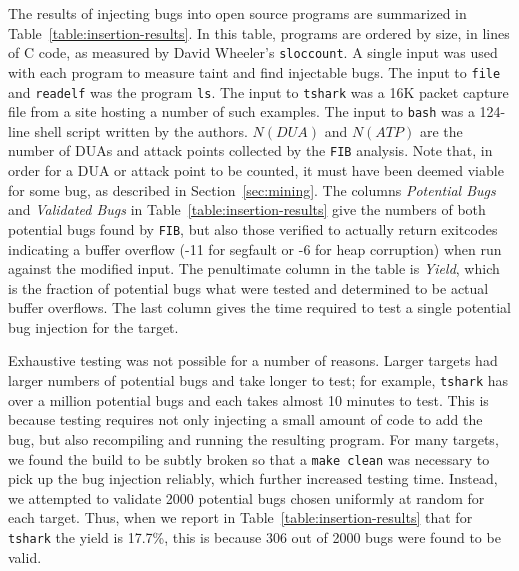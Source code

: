 The results of injecting bugs into open source programs are summarized in Table~\ref{table:insertion-results}.
In this table, programs are ordered by size, in lines of C code, as measured by David Wheeler's \verb+sloccount+.
A single input was used with each program to measure taint and find injectable bugs.
The input to \verb+file+ and \verb+readelf+ was the program \verb+ls+.
The input to \verb+tshark+ was a 16K packet capture file from a site hosting a number of such examples.  %
The input to \verb+bash+ was a 124-line shell script written by the authors.
$N(DUA)$ and $N(ATP)$ are the number of DUAs and attack points collected by the \verb+FIB+ analysis.
Note that, in order for a DUA or attack point to be counted, it must have been deemed viable for some bug, as described in Section~\ref{sec:mining}.
The columns \emph{Potential Bugs} and \emph{Validated Bugs} in Table~\ref{table:insertion-results} give the numbers of both potential bugs found by \verb+FIB+, but also those verified to actually return exitcodes indicating a buffer overflow (-11 for segfault or -6 for heap corruption) when run against the modified input.
The penultimate column in the table is \emph{Yield}, which is the fraction of potential bugs what were tested and determined to be actual buffer overflows.
The last column gives the time required to test a single potential bug injection for the target.


Exhaustive testing was not possible for a number of reasons.
Larger targets had larger numbers of potential bugs and take longer to test; for example, \verb+tshark+ has over a million potential bugs and each takes almost 10 minutes to test.
This is because testing requires not only injecting a small amount of code to add the bug, but also recompiling and running the resulting program.
For many targets, we found the build to be subtly broken so that a \verb+make clean+ was necessary to pick up the bug injection reliably, which further increased testing time.
Instead, we attempted to validate 2000 potential bugs chosen uniformly at random for each target.
Thus, when we report in Table~\ref{table:insertion-results} that for \verb+tshark+ the yield is 17.7\%, this is because 306 out of 2000 bugs were found to be valid.

